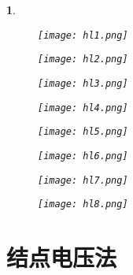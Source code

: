 \documentclass[UTF8]{report}
\theoremstyle{MyLineTheoremStyle} %
\theoremstyle{MyBlockTheoremStyle} %
\theoremstyle{MySubsubsectionStyle} %
\newtheorem{definition}{}
\begin{document}
\begin{definition}
    \begin{figure}[H]
        \centering
        \texttt{[image: hl1.png]}
    \end{figure}

    \begin{figure}[H]
        \centering
        \texttt{[image: hl2.png]}
    \end{figure}

    \begin{figure}[H]
        \centering
        \texttt{[image: hl3.png]}
    \end{figure}

    \begin{figure}[H]
        \centering
        \texttt{[image: hl4.png]}
    \end{figure}

    \begin{figure}[H]
        \centering
        \texttt{[image: hl5.png]}
    \end{figure}

    \begin{figure}[H]
        \centering
        \texttt{[image: hl6.png]}
    \end{figure}

    \begin{figure}[H]
        \centering
        \texttt{[image: hl7.png]}
    \end{figure}

    \begin{figure}[H]
        \centering
        \texttt{[image: hl8.png]}
    \end{figure}
\end{definition}

\section{结点电压法}
\end{document}

